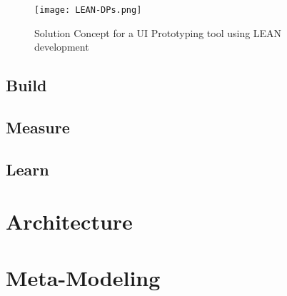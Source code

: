 \begin{figure}[htbp!]
  \centering    
  \texttt{[image: LEAN-DPs.png]}
  \caption[Solution Concept]{Solution Concept for a UI Prototyping tool using LEAN development}
  \label{fig:design:lean}
\end{figure}

\subsection{Build}
\label{design:section:build}

\subsection{Measure}
\label{design:section:measure}
\subsection{Learn}
\label{design:section:learn}

\section{Architecture}
\label{design:section:architecture}

\section{Meta-Modeling}
\label{design:section:metaModeling}
